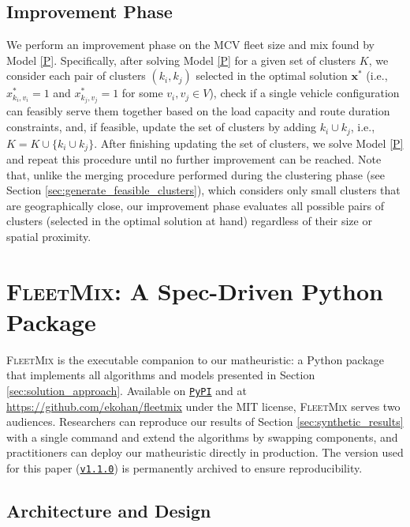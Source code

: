 \documentclass[11pt]{elsarticle}
\theoremstyle{plain}
\newcommand{\blue}[1]{#1}
\begin{document}
\subsection{Improvement Phase} \label{sec:improvement_phase}

We perform an improvement phase on the \ac{MCV} fleet size and mix found by \blue{Model} \eqref{P}.
Specifically, after solving \blue{Model} \eqref{P} for a given set of clusters $K$, we consider each pair of clusters $(k_i, k_j)$ selected in the optimal solution $\boldsymbol{x}^*$ (i.e., $x^*_{k_i,v_i} = 1$ and $x^*_{k_j,v_j} = 1$ for some $v_i, v_j \in V$), check if a single vehicle configuration can feasibly serve them together based on the load capacity and route duration constraints, and, if feasible, update the set of clusters by adding $k_i \cup k_j$, i.e., $K = K \cup \{k_i \cup k_j\}$. After finishing updating the set of clusters, we solve \blue{Model} \eqref{P} and repeat this procedure until no further improvement can be reached. Note that, unlike the merging procedure performed during the clustering phase (see Section \ref{sec:generate_feasible_clusters}), which considers only small clusters that are geographically close, our improvement phase evaluates all possible pairs of clusters (selected in the optimal solution at hand) regardless of their size or spatial proximity.

\section{\textsc{FleetMix}: A Spec-Driven Python Package} \label{sec:fleetmix}

\textsc{FleetMix} is the executable companion to our matheuristic: a Python package that implements all algorithms and models presented in Section \ref{sec:solution_approach}. Available on \href{https://pypi.org/project/fleetmix/}{\texttt{PyPI}} and at \url{https://github.com/ekohan/fleetmix} under the MIT license, \textsc{FleetMix} serves two audiences. Researchers can reproduce our results of Section \ref{sec:synthetic_results} with a single command and extend the algorithms by swapping components, and practitioners can deploy our matheuristic directly in production. The version used for this paper (\href{https://github.com/ekohan/fleetmix/releases/tag/v1.1.0}{\texttt{v1.1.0}}) is permanently archived to ensure reproducibility.

\subsection{Architecture and Design}
\end{document}
